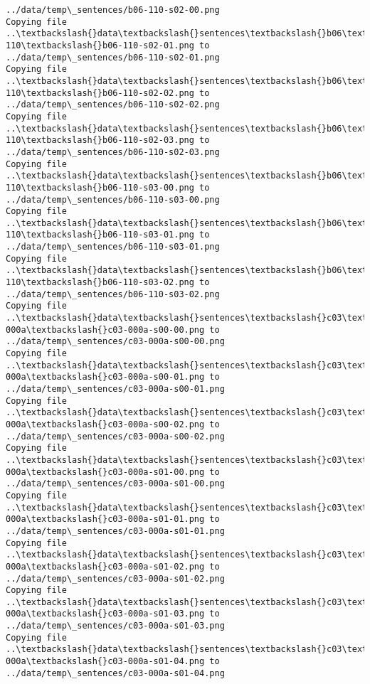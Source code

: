 \documentclass[11pt]{article}
\begin{document}
\begin{Verbatim}[commandchars=\\\{\}]
../data/temp\_sentences/b06-110-s02-00.png
Copying file ..\textbackslash{}data\textbackslash{}sentences\textbackslash{}b06\textbackslash{}b06-110\textbackslash{}b06-110-s02-01.png to
../data/temp\_sentences/b06-110-s02-01.png
Copying file ..\textbackslash{}data\textbackslash{}sentences\textbackslash{}b06\textbackslash{}b06-110\textbackslash{}b06-110-s02-02.png to
../data/temp\_sentences/b06-110-s02-02.png
Copying file ..\textbackslash{}data\textbackslash{}sentences\textbackslash{}b06\textbackslash{}b06-110\textbackslash{}b06-110-s02-03.png to
../data/temp\_sentences/b06-110-s02-03.png
Copying file ..\textbackslash{}data\textbackslash{}sentences\textbackslash{}b06\textbackslash{}b06-110\textbackslash{}b06-110-s03-00.png to
../data/temp\_sentences/b06-110-s03-00.png
Copying file ..\textbackslash{}data\textbackslash{}sentences\textbackslash{}b06\textbackslash{}b06-110\textbackslash{}b06-110-s03-01.png to
../data/temp\_sentences/b06-110-s03-01.png
Copying file ..\textbackslash{}data\textbackslash{}sentences\textbackslash{}b06\textbackslash{}b06-110\textbackslash{}b06-110-s03-02.png to
../data/temp\_sentences/b06-110-s03-02.png
Copying file ..\textbackslash{}data\textbackslash{}sentences\textbackslash{}c03\textbackslash{}c03-000a\textbackslash{}c03-000a-s00-00.png to
../data/temp\_sentences/c03-000a-s00-00.png
Copying file ..\textbackslash{}data\textbackslash{}sentences\textbackslash{}c03\textbackslash{}c03-000a\textbackslash{}c03-000a-s00-01.png to
../data/temp\_sentences/c03-000a-s00-01.png
Copying file ..\textbackslash{}data\textbackslash{}sentences\textbackslash{}c03\textbackslash{}c03-000a\textbackslash{}c03-000a-s00-02.png to
../data/temp\_sentences/c03-000a-s00-02.png
Copying file ..\textbackslash{}data\textbackslash{}sentences\textbackslash{}c03\textbackslash{}c03-000a\textbackslash{}c03-000a-s01-00.png to
../data/temp\_sentences/c03-000a-s01-00.png
Copying file ..\textbackslash{}data\textbackslash{}sentences\textbackslash{}c03\textbackslash{}c03-000a\textbackslash{}c03-000a-s01-01.png to
../data/temp\_sentences/c03-000a-s01-01.png
Copying file ..\textbackslash{}data\textbackslash{}sentences\textbackslash{}c03\textbackslash{}c03-000a\textbackslash{}c03-000a-s01-02.png to
../data/temp\_sentences/c03-000a-s01-02.png
Copying file ..\textbackslash{}data\textbackslash{}sentences\textbackslash{}c03\textbackslash{}c03-000a\textbackslash{}c03-000a-s01-03.png to
../data/temp\_sentences/c03-000a-s01-03.png
Copying file ..\textbackslash{}data\textbackslash{}sentences\textbackslash{}c03\textbackslash{}c03-000a\textbackslash{}c03-000a-s01-04.png to
../data/temp\_sentences/c03-000a-s01-04.png

\end{Verbatim}
\end{document}
